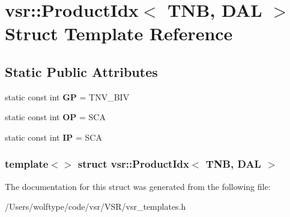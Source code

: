 \hypertarget{structvsr_1_1_product_idx_3_01_t_n_b_00_01_d_a_l_01_4}{\section{vsr\-:\-:Product\-Idx$<$ T\-N\-B, D\-A\-L $>$ Struct Template Reference}
\label{structvsr_1_1_product_idx_3_01_t_n_b_00_01_d_a_l_01_4}
}
\subsection*{Static Public Attributes}
\begin{DoxyCompactItemize}
\item 
\hypertarget{structvsr_1_1_product_idx_3_01_t_n_b_00_01_d_a_l_01_4_aba73dd6d1fa27f3df03fdfabed518ca3}{static const int {\bfseries G\-P} = T\-N\-V\-\_\-\-B\-I\-V}\label{structvsr_1_1_product_idx_3_01_t_n_b_00_01_d_a_l_01_4_aba73dd6d1fa27f3df03fdfabed518ca3}

\item 
\hypertarget{structvsr_1_1_product_idx_3_01_t_n_b_00_01_d_a_l_01_4_a9039dc22728d4c65cacdbda6d2e27c03}{static const int {\bfseries O\-P} = S\-C\-A}\label{structvsr_1_1_product_idx_3_01_t_n_b_00_01_d_a_l_01_4_a9039dc22728d4c65cacdbda6d2e27c03}

\item 
\hypertarget{structvsr_1_1_product_idx_3_01_t_n_b_00_01_d_a_l_01_4_ae6708a50eefdcce2e7aed76344395094}{static const int {\bfseries I\-P} = S\-C\-A}\label{structvsr_1_1_product_idx_3_01_t_n_b_00_01_d_a_l_01_4_ae6708a50eefdcce2e7aed76344395094}

\end{DoxyCompactItemize}
\subsubsection*{template$<$$>$ struct vsr\-::\-Product\-Idx$<$ T\-N\-B, D\-A\-L $>$}



The documentation for this struct was generated from the following file\-:\begin{DoxyCompactItemize}
\item 
/\-Users/wolftype/code/vsr/\-V\-S\-R/vsr\-\_\-templates.\-h\end{DoxyCompactItemize}
